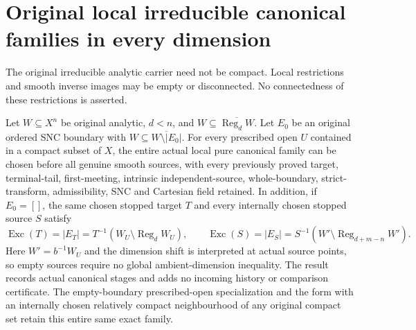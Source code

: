 \section{Original local irreducible canonical families in every dimension}

The original irreducible analytic carrier need not be compact. Local restrictions
and smooth inverse images may be empty or disconnected. No connectedness of
these restrictions is asserted.

\begin{theorem}
\label{hir:original-local-pure-same-family-exact-exceptional}
\leanok
Let $W\subseteq X^n$ be original analytic, $d<n$, and
$W\subseteq\overline{\operatorname{Reg}_d W}$. Let $E_0$ be an original
ordered SNC boundary with $W\subseteq\overline{W\setminus|E_0|}$.
For every prescribed open $U$ contained in a compact subset of $X$, the
entire actual local pure canonical family can be chosen before all genuine
smooth sources, with every previously proved target, terminal-tail,
first-meeting, intrinsic independent-source, whole-boundary, strict-transform,
admissibility, SNC and Cartesian field retained. In addition, if $E_0=[]$,
the same chosen stopped target $T$ and every internally chosen stopped source
$S$ satisfy
\[
 \operatorname{Exc}(T)=|E_T|=T^{-1}(W_U\setminus\operatorname{Reg}_dW_U),\qquad
 \operatorname{Exc}(S)=|E_S|=S^{-1}(W'\setminus
   \operatorname{Reg}_{d+m-n}W').
\]
Here $W'=b^{-1}W_U$ and the dimension shift is interpreted at actual source
points, so empty sources require no global ambient-dimension inequality.
The result records actual canonical stages and adds no incoming history or
comparison certificate. The empty-boundary prescribed-open specialization
and the form with an internally chosen relatively compact neighbourhood of
any original compact set retain this entire same exact family.
\end{theorem}
